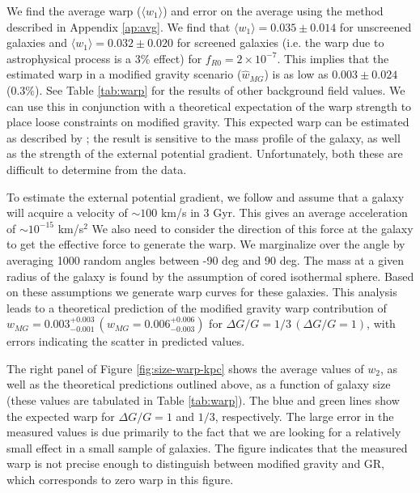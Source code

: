 \documentclass[useAMS,usenatbib,twocolumn]{mn2e}
\begin{document}
We find the average warp ($\langle w_1\rangle$) and error on the average 
using the method described in Appendix \ref{ap:avg}. We find that $\langle
w_1\rangle=0.035 \pm 0.014$ for unscreened galaxies and $\langle
w_1 \rangle=0.032 \pm 0.020$ for screened galaxies (i.e. the
warp due to astrophysical process is a 3\% effect) for $f_{R0} =
2\times10^{-7}$. This implies that the estimated warp in a modified gravity
scenario ($\hat{w}_{MG}$) is as low as $0.003 \pm 0.024$ (0.3\%). See Table
\ref{tab:warp} for
the results of other background field values. We can use this in conjunction
with a theoretical expectation of the warp strength to place loose
constraints on modified gravity. This expected warp can be estimated
as described by \citet{bhuvjake2011}; the result 
is sensitive to the mass profile of the galaxy,
as well as the strength of the external potential gradient. 
Unfortunately, both these are difficult to determine from the data.

To estimate the external potential gradient,
we follow \citet{bhuvjake2011} and assume that a galaxy will
acquire a velocity of $\sim 100$ km/s in 3 Gyr.
This gives an average acceleration of $\sim 10^{-15}$ km/s$^2$
We also need to consider
the direction of this force at the galaxy to get the effective force to
generate the warp. We marginalize over the angle by averaging
1000 random angles between -90 deg and 90 deg. The mass at a given
radius of the
galaxy is found by the assumption of cored isothermal sphere. Based on these
assumptions we generate warp curves for these galaxies.
This analysis leads to a theoretical prediction of the modified gravity
warp contribution of
$w_{MG}= 0.003_{-0.001}^{+0.003}\,(w_{MG}= 0.006_{-0.003}^{+0.006})$
for $\Delta G/G = 1/3\, (\Delta G/G = 1)$,
with errors indicating the scatter in predicted values.

The right panel of Figure \ref{fig:size-warp-kpc} shows the average
values of $w_2$, as well as the theoretical predictions outlined
above, as a function of galaxy size (these values are tabulated
in Table \ref{tab:warp}).
The blue and green lines show the expected warp for $\Delta G/G
= 1$ and $1/3$, respectively.
The large error in the measured values
is due primarily to the fact that we are looking for a
relatively small effect in a small sample of galaxies.
The figure indicates that the measured warp is not precise enough to
distinguish between modified gravity and GR, which corresponds to zero
warp in this figure.
\end{document}
